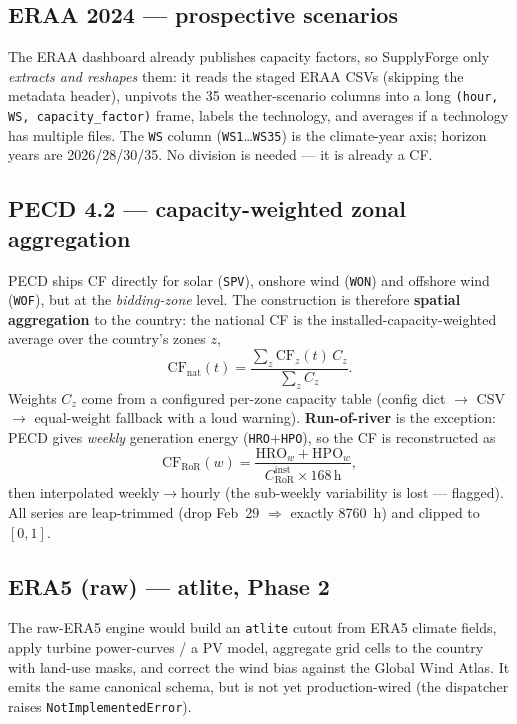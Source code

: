 \documentclass[11pt,a4paper]{article}
\begin{document}
\subsection{ERAA 2024 --- prospective scenarios}
The ERAA dashboard already publishes capacity factors, so SupplyForge only \emph{extracts and reshapes}
them: it reads the staged ERAA CSVs (skipping the metadata header), unpivots the 35 weather-scenario
columns into a long \texttt{(hour, WS, capacity\_factor)} frame, labels the technology, and averages if a
technology has multiple files. The \texttt{WS} column (\texttt{WS1}\dots\texttt{WS35}) is the climate-year
axis; horizon years are 2026/28/30/35. No division is needed --- it is already a CF.

\subsection{PECD 4.2 --- capacity-weighted zonal aggregation}
PECD ships CF directly for solar (\texttt{SPV}), onshore wind (\texttt{WON}) and offshore wind
(\texttt{WOF}), but at the \emph{bidding-zone} level. The construction is therefore \textbf{spatial
aggregation} to the country: the national CF is the installed-capacity-weighted average over the
country's zones $z$,
\begin{equation}
\mathrm{CF}_{\text{nat}}(t)=\frac{\sum_z \mathrm{CF}_z(t)\,C_z}{\sum_z C_z}.
\label{eq:cfnat}
\end{equation}
Weights $C_z$ come from a configured per-zone capacity table (config dict $\to$ CSV $\to$ equal-weight
fallback with a loud warning). \textbf{Run-of-river} is the exception: PECD gives \emph{weekly}
generation energy (\texttt{HRO}+\texttt{HPO}), so the CF is reconstructed as
\begin{equation}
\mathrm{CF}_{\text{RoR}}(w)=\frac{\text{HRO}_w+\text{HPO}_w}{C^{\text{inst}}_{\text{RoR}}\times 168\,\text{h}},
\label{eq:cfror}
\end{equation}
then interpolated weekly$\to$hourly (the sub-weekly variability is lost --- flagged). All series are
leap-trimmed (drop Feb~29 $\Rightarrow$ exactly 8760~h) and clipped to $[0,1]$.

\subsection{ERA5 (raw) --- atlite, Phase 2}
The raw-ERA5 engine would build an \texttt{atlite} cutout from ERA5 climate fields, apply turbine
power-curves / a PV model, aggregate grid cells to the country with land-use masks, and correct the wind
bias against the Global Wind Atlas. It emits the same canonical schema, but is not yet production-wired
(the dispatcher raises \texttt{NotImplementedError}).
\end{document}
